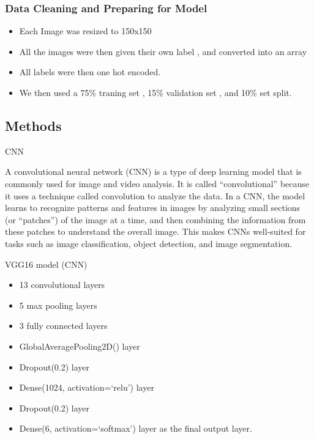 \documentclass[
  letterpaper,
  DIV=11,
  numbers=noendperiod]{scrartcl}
\providecommand{\tightlist}{%
  \setlength{\itemsep}{0pt}\setlength{\parskip}{0pt}}\usepackage{longtable,booktabs,array}
\begin{document}
\hypertarget{data-cleaning-and-preparing-for-model}{%
\subsubsection{Data Cleaning and Preparing for
Model}\label{data-cleaning-and-preparing-for-model}}

\begin{itemize}
\item
  Each Image was resized to 150x150
\item
  All the images were then given their own label , and converted into an
  array
\item
  All labels were then one hot encoded.
\item
  We then used a 75\% traning set , 15\% validation set , and 10\% set
  split.
\end{itemize}

\hypertarget{methods}{%
\subsection{Methods}\label{methods}}

CNN

A convolutional neural network (CNN) is a type of deep learning model
that is commonly used for image and video analysis. It is called
``convolutional'' because it uses a technique called convolution to
analyze the data. In a CNN, the model learns to recognize patterns and
features in images by analyzing small sections (or ``patches'') of the
image at a time, and then combining the information from these patches
to understand the overall image. This makes CNNs well-suited for tasks
such as image classification, object detection, and image segmentation.

VGG16 model (CNN)

\begin{itemize}
\tightlist
\item
  13 convolutional layers
\item
  5 max pooling layers
\item
  3 fully connected layers
\item
  GlobalAveragePooling2D() layer
\item
  Dropout(0.2) layer
\item
  Dense(1024, activation=`relu') layer
\item
  Dropout(0.2) layer
\item
  Dense(6, activation=`softmax') layer as the final output layer.
\end{itemize}
\end{document}
